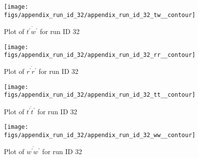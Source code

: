 \begin{figure}[H]
\centering
\texttt{[image: figs/appendix\_run\_id\_32/appendix\_run\_id\_32\_tw\_\_contour]}
\caption{Plot of $\overline{t^\prime w^\prime}$ for run ID 32}
\label{fig:appendix_run_id_32_tw__contour}
\end{figure}


\begin{figure}[H]
\centering
\texttt{[image: figs/appendix\_run\_id\_32/appendix\_run\_id\_32\_rr\_\_contour]}
\caption{Plot of $\overline{r^\prime r^\prime}$ for run ID 32}
\label{fig:appendix_run_id_32_rr__contour}
\end{figure}


\begin{figure}[H]
\centering
\texttt{[image: figs/appendix\_run\_id\_32/appendix\_run\_id\_32\_tt\_\_contour]}
\caption{Plot of $\overline{t^\prime t^\prime}$ for run ID 32}
\label{fig:appendix_run_id_32_tt__contour}
\end{figure}


\begin{figure}[H]
\centering
\texttt{[image: figs/appendix\_run\_id\_32/appendix\_run\_id\_32\_ww\_\_contour]}
\caption{Plot of $\overline{w^\prime w^\prime}$ for run ID 32}
\label{fig:appendix_run_id_32_ww__contour}
\end{figure}


